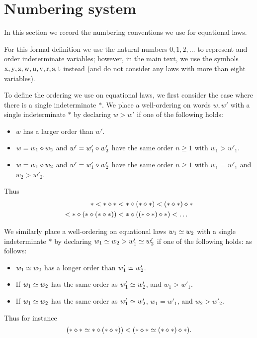 \section{Numbering system}\label{numbering-app}

In this section we record the numbering conventions we use for equational laws.

For this formal definition we use the natural numbers $0,1,2,\dots$ to represent and order indeterminate variables; however, in the main text, we use the symbols $\mathrm{x},\mathrm{y},\mathrm{z},\mathrm{w},\mathrm{u},\mathrm{v},\mathrm{r},\mathrm{s},\mathrm{t}$ instead (and do not consider any laws with more than eight variables).

To define the ordering we use on equational laws, we first consider the case where there is a single indeterminate $\ast$.
We place a well-ordering on words $w,w'$ with a single indeterminate $\ast$ by declaring $w > w'$ if one of the following holds:
\begin{itemize}
    \item $w$ has a larger order than $w'$.
    \item $w = w_1 \diamond w_2$ and $w' = w'_1 \diamond w'_2$ have the same order $n \geq 1$ with $w_1 > w'_1$.
    \item $w = w_1 \diamond w_2$ and $w' = w'_1 \diamond w'_2$ have the same order $n \geq 1$ with $w_1 = w'_1$ and $w_2 > w'_2$.
\end{itemize}
Thus
\begin{align*}
    \ast < \ast \diamond \ast &< \ast \diamond (\ast \diamond \ast) < (\ast \diamond \ast) \diamond \ast \\
    < \ast \diamond (\ast \diamond (\ast \diamond \ast)) &< \ast \diamond ((\ast \diamond \ast) \diamond \ast) < \dots
\end{align*}

We similarly place a well-ordering on equational laws $w_1 \simeq w_2$ with a single indeterminate $\ast$ by declaring $w_1 \simeq w_2 > w'_1 \simeq w'_2$ if one of the following holds:
as follows:
\begin{itemize}
\item  $w_1 \simeq w_2$ has a longer order than $w'_1 \simeq w'_2$.
\item If $w_1 \simeq w_2$ has the same order as $w'_1 \simeq w'_2$, and $w_1 > w'_1$.
\item If $w_1 \simeq w_2$ has the same order as $w'_1 \simeq w'_2$, $w_1 = w'_1$, and $w_2 > w'_2$.
\end{itemize}
Thus for instance
$$ (\ast \diamond \ast \simeq \ast \diamond (\ast \diamond \ast)) < (\ast \diamond \ast \simeq (\ast \diamond \ast) \diamond \ast).$$

